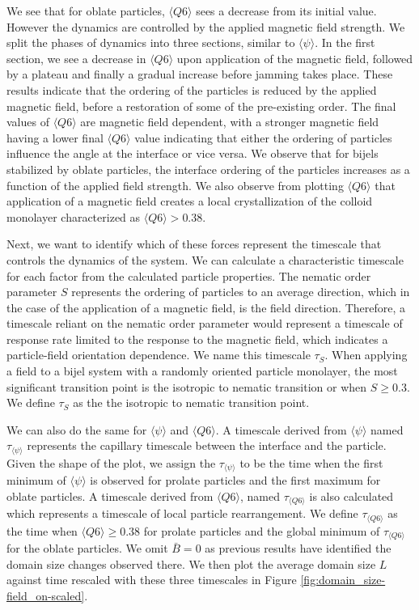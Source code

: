 We see that for oblate particles, $\langle Q6 \rangle$ sees a decrease from its initial value. However the dynamics are controlled by
the applied magnetic field strength. We split the phases of dynamics into three sections, similar to $\langle \psi \rangle$. In the first
section, we see a decrease in $\langle Q6 \rangle$ upon application of the magnetic field, followed by a plateau and finally a gradual increase
before jamming takes place. These results indicate that the ordering of the particles is reduced by the applied magnetic field, before a
restoration of some of the pre-existing order. The final values of $\langle Q6 \rangle$ are magnetic field dependent, with a stronger
magnetic field having a lower final $\langle Q6 \rangle$ value indicating that either the ordering of particles influence the angle at
the interface or vice versa. We observe that for bijels stabilized by oblate particles, the interface ordering of the particles increases as a
function of the applied field strength. We also observe from plotting $\langle Q6 \rangle$ that application of a magnetic field creates a
local crystallization of the colloid monolayer characterized as $\langle Q6 \rangle > 0.38$. \cite{toxvaerd_role_2020}

Next, we want to identify which of these forces represent the timescale that controls the dynamics of the system. We can calculate a characteristic
timescale for each factor from the calculated particle properties.
The nematic order parameter $S$ represents the ordering of
particles to an average direction, which in the case of the application
of a magnetic field, is the field direction. Therefore, a timescale
reliant on the nematic order parameter would represent a timescale of
response rate limited to the response to the magnetic field, which
indicates a particle-field orientation dependence. We name this
timescale $\tau_S$. When applying a field to a bijel system with a
randomly oriented particle monolayer, the most significant transition
point is the isotropic to nematic transition or when $S \geq 0.3$. We
define $\tau_S$ as the the isotropic to nematic transition point.

We can also do the same for $\langle \psi \rangle$ and
$\langle Q6 \rangle$. A timescale derived from
$\langle \psi \rangle$ named $\tau_{\langle \psi \rangle}$
represents the capillary timescale between the interface and the
particle. Given the shape of the plot, we assign the
$\tau_{\langle \psi \rangle}$ to be the time when the first minimum of
$\langle \psi \rangle$ is observed for prolate particles and the first
maximum for oblate particles. A timescale derived from
$\langle Q6 \rangle$, named $\tau_{\langle Q6 \rangle}$ is also
calculated which represents a timescale of local particle rearrangement.
We define $\tau_{\langle Q6 \rangle}$ as the time when
\(\langle Q6 \rangle \geq 0.38\) for prolate particles and the global
minimum of $\tau_{\langle Q6 \rangle}$ for the oblate particles. We
omit \(\bar{B} = 0\) as previous results have identified the domain size
changes observed there. We then plot the average domain size \(L\)
against time rescaled with these three timescales in Figure
\ref{fig:domain_size-field_on-scaled}.


